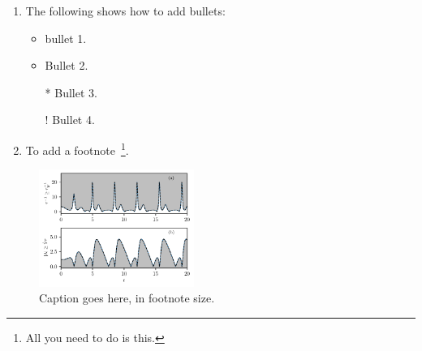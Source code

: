 \documentclass[prl,aps,reprint,noshowpacs,superscriptaddress,floatfix,letterpaper,longbibliography]{revtex4-2}
\begin{document}
\begin{enumerate}
\item The following shows how to add bullets: 
\begin{itemize}
  \item bullet 1. 
  \item Bullet 2.
  \item[*] Bullet 3. 
  \item[!] Bullet 4. 
  \label{ListBullets}
\end{itemize}

\item To add a footnote~\footnote{All you need to do is this.}. 

\label{ListEnumarated}
\end{enumerate} 
 

\lipsum[2-3]

 \begin{figure}[h!] %
	\centering
	\hspace*{-0.75cm}\includegraphics[width=0.45\textwidth]{sample-plot.pdf}
	\caption{\footnotesize{Caption goes here, in footnote size.}}
	\label{fig:plot-label}
\end{figure}
 
\end{document}
